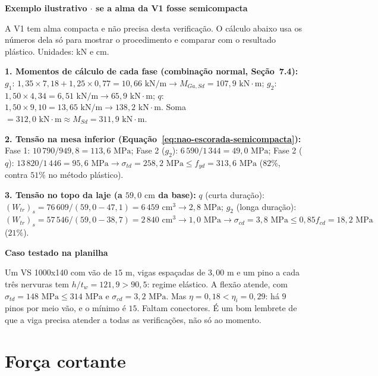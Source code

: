 \documentclass[11pt,a4paper]{article}
\newcommand{\caixaconceito}[2]{%
  \par\vspace{6pt}\noindent\colorbox{calloutbg}{%
    \parbox{\dimexpr\linewidth-2\fboxsep\relax}{%
      \vspace{4pt}\textbf{\color{primary}#1}\par\vspace{3pt}#2\vspace{4pt}%
    }%
  }\par\vspace{6pt}%
}
\newcommand{\caixaexemplo}[2]{%
  \par\vspace{6pt}\noindent\colorbox{examplebg}{%
    \parbox{\dimexpr\linewidth-2\fboxsep\relax}{%
      \vspace{4pt}\textbf{\color{exampleaccent}#1}\par\vspace{3pt}#2\vspace{4pt}%
    }%
  }\par\vspace{6pt}%
}
\begin{document}
\caixaexemplo{Exemplo ilustrativo $\cdot$ se a alma da V1 fosse semicompacta}{%
A V1 tem alma compacta e não precisa desta verificação. O cálculo abaixo usa os números dela só para mostrar o procedimento e comparar com o resultado plástico. Unidades: kN e cm.\par\vspace{3pt}
\textbf{1. Momentos de cálculo de cada fase (combinação normal, Seção~7.4):} $g_1$: $1{,}35 \times 7{,}18 + 1{,}25 \times 0{,}77 = 10{,}66\text{ kN/m} \rightarrow M_{Ga,Sd} = 107{,}9\text{ kN}\cdot\text{m}$; $g_2$: $1{,}50 \times 4{,}34 = 6{,}51\text{ kN/m} \rightarrow 65{,}9\text{ kN}\cdot\text{m}$; $q$: $1{,}50 \times 9{,}10 = 13{,}65\text{ kN/m} \rightarrow 138{,}2\text{ kN}\cdot\text{m}$. Soma $= 312{,}0\text{ kN}\cdot\text{m} \approx M_{Sd} = 311{,}9\text{ kN}\cdot\text{m}$.\par
\textbf{2. Tensão na mesa inferior (Equação~\ref{eq:nao-escorada-semicompacta}):} Fase 1: $10\,790/949{,}8 = 113{,}6\text{ MPa}$; Fase 2 ($g_2$): $6\,590/1\,344 = 49{,}0\text{ MPa}$; Fase 2 ($q$): $13\,820/1\,446 = 95{,}6\text{ MPa} \rightarrow \sigma_{td} = 258{,}2\text{ MPa} \le f_{yd} = 313{,}6\text{ MPa}$ ($82\%$, contra $51\%$ no método plástico).\par
\textbf{3. Tensão no topo da laje (a $59{,}0\text{ cm}$ da base):} $q$ (curta duração): $(W_{tr})_s = 76\,609/(59{,}0 - 47{,}1) = 6\,459\text{ cm}^3 \rightarrow 2{,}8\text{ MPa}$; $g_2$ (longa duração): $(W_{tr})_s = 57\,546/(59{,}0 - 38{,}7) = 2\,840\text{ cm}^3 \rightarrow 1{,}0\text{ MPa} \rightarrow \sigma_{cd} = 3{,}8\text{ MPa} \le 0{,}85 f_{cd} = 18{,}2\text{ MPa}$ ($21\%$).}

\caixaconceito{Caso testado na planilha}{%
Um VS 1000x140 com vão de $15\text{ m}$, vigas espaçadas de $3{,}00\text{ m}$ e um pino a cada três nervuras tem $h/t_w = 121{,}9 > 90{,}5$: regime elástico. A flexão atende, com $\sigma_{td} = 148\text{ MPa} \le 314\text{ MPa}$ e $\sigma_{cd} = 3{,}2\text{ MPa}$. Mas $\eta = 0{,}18 < \eta_i = 0{,}29$: há $9$ pinos por meio vão, e o mínimo é $15$. Faltam conectores. É um bom lembrete de que a viga precisa atender a todas as verificações, não só ao momento.}

\section{Força cortante}
\end{document}
